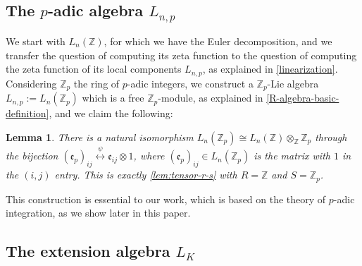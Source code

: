 \documentclass{article}
\newtheorem{lemma}[theorem]{Lemma}
\newcommand{\e}{\mathfrak{e}}
\begin{document}
\subsection{The $p$-adic algebra $L_{n,p}$}
\label{p-adic-algebra-definition}
We start with $L_n(\mathbb{Z})$, for which we have the Euler decomposition, and we transfer the question of computing its zeta function to the question of computing the zeta function of its local components $L_{n,p}$, as explained in \ref{linearization}.
Considering $\mathbb{Z}_p$ the ring of $p$-adic integers, we construct a $\mathbb{Z}_p$-Lie algebra $L_{n,p}:=L_n(\mathbb{Z}_p)$ which is a free $\mathbb{Z}_p$-module, as explained in \ref{R-algebra-basic-definition}, and we claim the following:
\begin{lemma}
\label{lem:L-tensor-p-adic-integers}
There is a natural isomorphism $L_n(\mathbb{Z}_p)\cong{L}_n(\mathbb{Z})\otimes_\mathbb{Z}\mathbb{Z}_p$ through the bijection $(\e_p)_{ij}\overset{\psi}{\longleftrightarrow}\e_{ij}\otimes1$, where $(\e_p)_{ij}\in{L}_n(\mathbb{Z}_p)$ is the matrix with $1$ in the $(i,j)$ entry.
This is exactly \ref{lem:tensor-r-s} with $R=\mathbb{Z}$ and $S=\mathbb{Z}_p$.
\end{lemma}
This construction is essential to our work, which is based on the theory of $p$-adic integration, as we show later in this paper.
\subsection{The extension algebra $L_K$}
\end{document}
